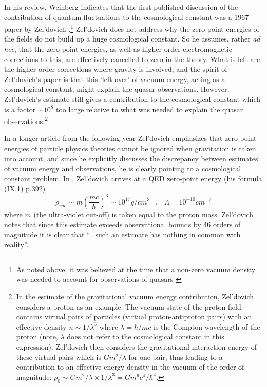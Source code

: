 \documentclass[12pt]{article}
\newcommand{\beq}{\begin{equation}}
\newcommand{\eeq}{\end{equation}}
\begin{document}
In his review, Weinberg indicates that the first published discussion
of the contribution of quantum fluctuations to the cosmological
constant was a 1967 paper by Zel'dovich
\cite{zeldovich67}.\footnote{As noted above, it was believed at the
time that a non-zero vacuum density was needed to account for
observations of quasars \cite{petrosian74}} Zel'dovich does not
address why the zero-point energies of the fields do not build up a
huge cosmological constant.  So he assumes, rather {\em ad hoc}, that
the zero-point energies, as well as higher order electromagnetic
corrections to this, are effectively cancelled to zero in the
theory. What is left are the higher order corrections
where gravity is involved, and the spirit of Zel'dovich's paper is
that this `left over' of vacuum energy, acting as a cosmological
constant, might explain the quasar observations. However, Zel'dovich's
estimate still gives a contribution to the cosmological constant which
is a factor $\sim 10^8$ too large relative to what was needed to
explain the quasar observations.\footnote{In the estimate of the
gravitational vacuum energy contribution, Zel'dovich considers a
proton as an example. The vacuum state of the proton field contains virtual
pairs of particles (virtual proton-antiproton pairs) with an effective
density $ n \sim 1 / \lambda^3 $ where $\lambda =
\hbar/ m c$ is the Compton wavelength of the proton (note, $\lambda$
does not refer to the cosmological constant in this expression). 
Zel'dovich then considers the gravitational
interaction energy of these virtual pairs which is $G m^2 /
\lambda$ for one pair, thus leading to a contribution to an
effective energy density in the vacuum of the order of magnitude: $
\rho_0 \sim G m^2/\lambda \times 1/\lambda^3 = G m^6 c^4 / \hbar^4 $.}

In a longer article \cite{zeldovich68} from the following year
Zel'dovich emphasizes that zero-point energies of particle
physics theories cannot be ignored when gravitation is taken into
account, and since he explicitly discusses the discrepancy
between estimates of vacuum energy and observations, he is
clearly pointing to a cosmological constant problem. In
\cite{zeldovich68}, Zel'dovich arrives at a QED zero-point energy
(his formula (IX.1) p.392) 
\beq 
\rho_{vac} \sim m \left (\frac{mc}{\hbar} \right ) ^3 \sim 10^{17} g/cm^3
\:\;\; , \:\;\; \Lambda = 10^{-10} cm^{-2}
\eeq
where $m$ (the ultra-violet cut-off) is taken equal to the proton
mass. Zel'dovich notes that since this estimate exceeds
observational bounds by 46 orders of magnitude it is clear that
``...such an estimate has nothing in common with reality''. 
\end{document}
